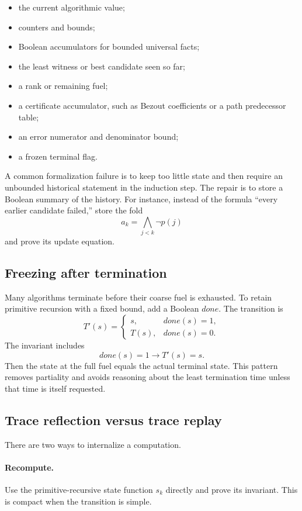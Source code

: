 \begin{itemize}
\item the current algorithmic value;
\item counters and bounds;
\item Boolean accumulators for bounded universal facts;
\item the least witness or best candidate seen so far;
\item a rank or remaining fuel;
\item a certificate accumulator, such as Bezout coefficients or a path predecessor table;
\item an error numerator and denominator bound;
\item a frozen terminal flag.
\end{itemize}

A common formalization failure is to keep too little state and then require an unbounded historical statement in the induction step.  The repair is to store a Boolean summary of the history.  For instance, instead of the formula ``every earlier candidate failed,'' store the fold
\[
 a_k=\bigwedge_{j<k}\neg p(j)
\]
and prove its update equation.

\subsection{Freezing after termination}

Many algorithms terminate before their coarse fuel is exhausted.  To retain primitive recursion with a fixed bound, add a Boolean \(done\).  The transition is
\[
 T'(s)=
 \begin{cases}
 s,&done(s)=1,\\
 T(s),&done(s)=0.
 \end{cases}
\]
The invariant includes
\[
 done(s)=1\to T'(s)=s.
\]
Then the state at the full fuel equals the actual terminal state.  This pattern removes partiality and avoids reasoning about the least termination time unless that time is itself requested.

\subsection{Trace reflection versus trace replay}

There are two ways to internalize a computation.

\paragraph{Recompute.}
Use the primitive-recursive state function \(s_k\) directly and prove its invariant.  This is compact when the transition is simple.

